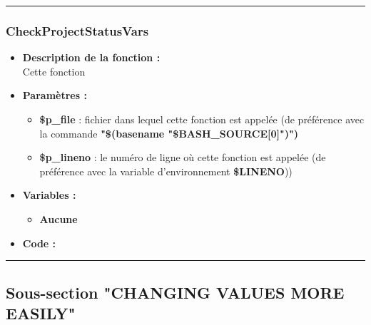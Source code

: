 \documentclass[a4paper,10pt]{article}
\begin{document}
\color{blue}\par\noindent\rule{\textwidth}{0.4pt}\color{white}

\color{blue}
\subsubsection{CheckProjectStatusVars}\color{white}

\begin{itemize}
    \item \textbf{Description de la fonction :}\\
    Cette fonction\\[1\baselineskip]

    \item \textbf{Paramètres :}
    \begin{itemize}
        \item \color{orange}\textbf{\$p\_file}\color{white} : fichier dans lequel cette fonction est appelée (de préférence avec la commande \textbf{"\$(\color{gray}basename \color{white}"\color{orange}\$BASH\_SOURCE[0]\color{white}")")}\\[1\baselineskip]

        \item \color{orange}\textbf{\$p\_lineno}\color{white} : le numéro de ligne où cette fonction est appelée (de préférence avec la variable d'environnement \textbf{\color{orange}\$LINENO}))\\[1\baselineskip]
    \end{itemize}

    \item \textbf{Variables :}
    \begin{itemize}
        \item \textbf{Aucune}\\[1\baselineskip]
    \end{itemize}

    \item \textbf{Code :}
\end{itemize}



\color{green}\par\noindent\rule{\textwidth}{0.4pt}\color{white}

\color{green}
\subsection{Sous-section "CHANGING VALUES MORE EASILY"}\color{white}
\end{document}
